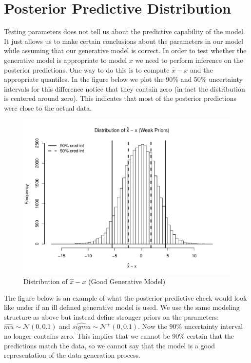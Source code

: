 \documentclass[12pt]{article}
\begin{document}
\section{Posterior Predictive Distribution}

Testing parameters does not tell us about the predictive capability of the model. It just allows us to make certain conclusions about the parameters in our model while assuming that our generative model is correct. In order to test whether the generative model is appropriate to model $x$ we need to perform inference on the posterior predictions.
One way to do this is to compute $\hat{x}-x$ and the appropriate quantiles. In the figure below we plot the 90\% and 50\% uncertainty intervals for this difference notice that they contain zero (in fact the distribution is centered around zero). This indicates that most of the posterior predictions were close to the actual data.


\begin{figure}[H]\caption[]{Distribution of $\hat{x}-x$ (Good Generative Model)}
\centering
\begin{minipage}{0.6\linewidth}
\includegraphics[trim={0cm 0cm 0cm 1.5cm}, clip, scale=0.6]{../figs/norm1_pp_diff.pdf}
\end{minipage}
\end{figure}

\noindent The figure below is an example of what the posterior predictive check would look like under if an ill defined generative model is used. We use the same modeling structure as above but instead define stronger priors on the parameters: $\hat{mu} \sim \mathcal{N}(0,0.1)$ and $\hat{sigma} \sim \mathcal{N}^{+}(0,0.1)$. Now the 90\% uncertainty interval no longer contains zero. This implies that we cannot be 90\% certain that the predictions match the data, so we cannot say that the model is a good representation of the data generation process.
\end{document}
